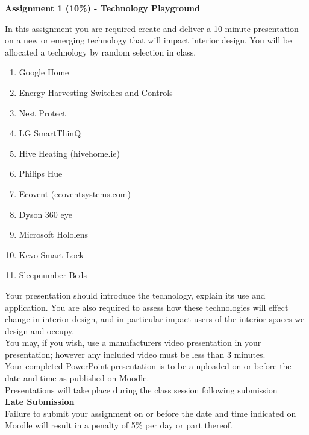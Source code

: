 
	
\begin{flushleft}
\Large\textbf{Assignment 1 (10\%) - Technology Playground}\\
\end{flushleft}

In this assignment you are required create and deliver a 10 minute presentation on a new or emerging technology that will impact interior design.  You will be allocated a technology by random selection in class.


\begin{enumerate}
	\item Google Home
	\item Energy Harvesting Switches and Controls
	\item Nest Protect
	\item LG SmartThinQ
	\item Hive Heating (hivehome.ie)
	\item Philips Hue
	\item Ecovent (ecoventsystems.com)
	\item Dyson 360 eye
	\item Microsoft Hololens
	\item Kevo Smart Lock
	\item Sleepnumber Beds
\end{enumerate}

Your presentation should introduce the technology, explain its use and application.  You are also required to assess how these technologies will effect change in interior design, and in particular impact users of the interior spaces we design and occupy.\\

You may, if you wish, use a manufacturers video presentation in your presentation; however any included video must be less than 3 minutes.\\

Your completed PowerPoint presentation is to be a uploaded on or before the date and time as published on Moodle.\\

Presentations will take place during the class session following submission\\

\textbf{Late Submission}\\
Failure to submit your assignment on or before the date and time indicated on Moodle will result in a penalty of 5\% per day or part thereof.  

